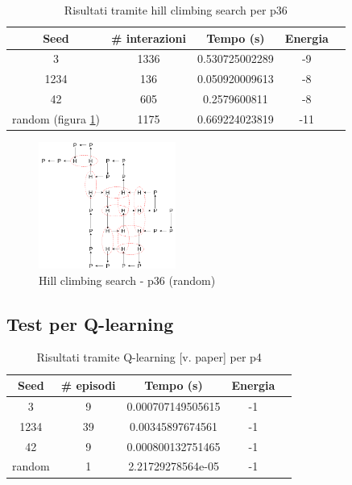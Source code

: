 \documentclass[conference]{IEEEtran}
\begin{document}
\begin{table}[H]
\begin{center}
\begin{tabular}{|c|c|c|c|c|}
\hline
\textbf{Seed} & \textbf{\# interazioni} & \textbf{Tempo (s)} & \textbf{Energia} \\ \hline
3 & 1336 & 0.530725002289 & -9 \\ \hline
1234 & 136 & 0.050920009613 & -8 \\ \hline
42 & 605 & 0.2579600811 & -8 \\ \hline
random (figura \ref{fig:lsp36}) & 1175 & 0.669224023819 & -11 \\ \hline
\end{tabular}
\end{center}
\caption{Risultati tramite hill climbing search per p36}
\end{table}

\begin{figure}[H]
\centering
\includegraphics[width=0.4\textwidth]{figure/p36LS.png}
\caption{Hill climbing search - p36 (random)}
\label{fig:lsp36}
\end{figure}

\subsection{Test per Q-learning}

\begin{table}[H]
\begin{center}
\begin{tabular}{|c|c|c|c|c|}
\hline
\textbf{Seed} & \textbf{\# episodi} & \textbf{Tempo (s)} & \textbf{Energia} \\ \hline
3 & 9 & 0.000707149505615 & -1 \\ \hline
1234 & 39 & 0.00345897674561 & -1 \\ \hline
42 & 9 & 0.000800132751465 & -1 \\ \hline
random & 1 & 2.21729278564e-05 & -1 \\ \hline
\end{tabular}
\end{center}
\caption{Risultati tramite Q-learning [v. paper] per p4}
\end{table}
\end{document}
